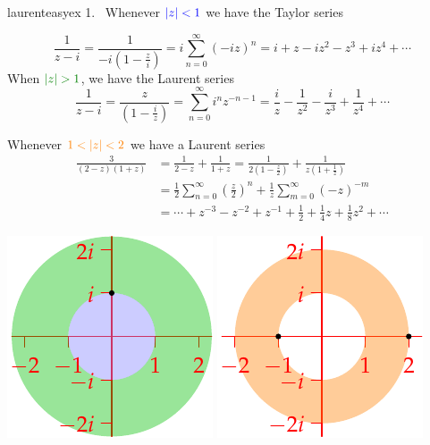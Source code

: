\begin{examples}{}{laurenteasyex}
\hangindent\leftmargini
\textup{1.} \ Whenever $\textcolor{blue}{\left| z\right|<1}$ we have the Taylor series\par
\begin{enumerate}\setcounter{enumi}{1}
  \begin{minipage}[t]{0.73\linewidth}\vspace{-13pt}
  \item[]\[\frac 1{z-i}=\frac 1{-i(1-\frac zi)}=i\sum_{n=0}^\infty(-iz)^n=i+z-iz^2-z^3+iz^4+\cdots\]
When $\textcolor{Green}{\nm z>1}$, we have the Laurent series
\[\frac 1{z-i}=\frac z{(1-\frac iz)}=\sum_{n=0}^\infty i^nz^{-n-1}=\frac iz-\frac 1{z^2}-\frac i{z^3}+\frac 1{z^4}+\cdots\]

	\item Whenever $\textcolor{orange}{1<\left| z\right|<2}$ we have a Laurent series
	\begin{align*}
	\frac 3{(2-z)(1+z)}&=\frac 1{2-z}+\frac 1{1+z}=\frac 1{2(1-\frac z2)}+\frac 1{z(1+\frac 1z)} \\
	&=\frac 12\sum_{n=0}^\infty\left(\frac z2\right)^n+\frac 1z\sum_{m=0}^\infty(-z)^{-m}\\
	&=\cdots +z^{-3}-z^{-2}+z^{-1}+\frac 12+\frac 14z+\frac 18z^2+\cdots
	\end{align*}
	\end{minipage}\begin{minipage}[t]{0.27\linewidth}\vspace{-20pt}
	\flushright\includegraphics{laurent5}\bigbreak
	\includegraphics{laurent6}
	\end{minipage}\par	
	

\end{enumerate}
\end{examples}
